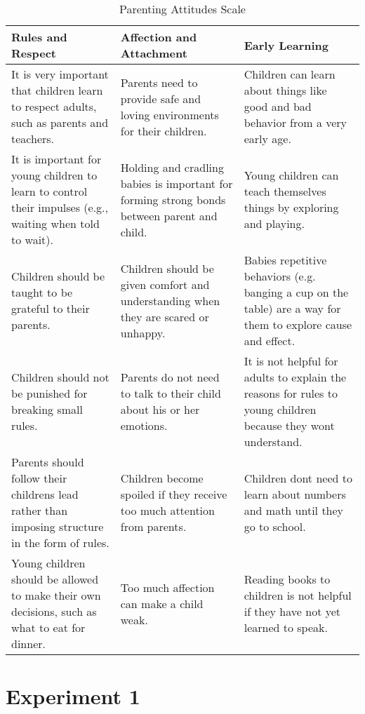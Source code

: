 \documentclass[10pt, letterpaper]{article}
\begin{document}
\begin{table}[t]
\centering
\begin{tabular}{lll}
  \hline
Rules and Respect & Affection and Attachment & Early Learning \\ 
  \hline
It is very important that children learn to respect adults, such as parents and teachers. & Parents need to provide safe and loving environments for their children. & Children can learn about things like good and bad behavior from a very early age. \\ 
  It is important for young children to learn to control their impulses (e.g., waiting when told to wait). & Holding and cradling babies is important for forming strong bonds between parent and child. & Young children can teach themselves things by exploring and playing. \\ 
  Children should be taught to be grateful to their parents. & Children should be given comfort and understanding when they are scared or unhappy. & Babies repetitive behaviors (e.g. banging a cup on the table) are a way for them to explore cause and effect. \\ 
  Children should not be punished for breaking small rules. & Parents do not need to talk to their child about his or her emotions. & It is not helpful for adults to explain the reasons for rules to young children because they wont understand. \\ 
  Parents should follow their childrens lead rather than imposing structure in the form of rules. & Children become spoiled if they receive too much attention from parents. & Children dont need to learn about numbers and math until they go to school. \\ 
  Young children should be allowed to make their own decisions, such as what to eat for dinner. & Too much affection can make a child weak. & Reading books to children is not helpful if they have not yet learned to speak. \\ 
   \hline
\end{tabular}
\caption{Parenting Attitudes Scale} 
\end{table}

\section{Experiment 1}\label{experiment-1}
\end{document}
